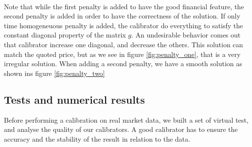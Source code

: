 \documentclass[a4paper,10pt]{article}
\begin{document}
\paragraph{} Note that while the first penalty is added to have the good financial feature, the second penalty is added in order to have the correctness of the solution. If only time homogeneuous penalty is added, the calibrator do everything to satisfy the constant diagonal property of the matrix $g$. An undesirable behavior comes out that calibrator increase one diagonal, and decrease the others. This solution can match the quoted price, but as we see in figure \ref{fig:penalty_one}, that is a very irregular solution. When adding a second penalty, we have a smooth solution as shown ins figure \ref{fig:penalty_two} 

\subsection{Tests and numerical results}
Before performing a calibration on real market data, we built a set of virtual test, and analyse the quality of our calibrators. A good calibrator has to ensure the accuracy and the stability of the result in relation to the data.
\end{document}

